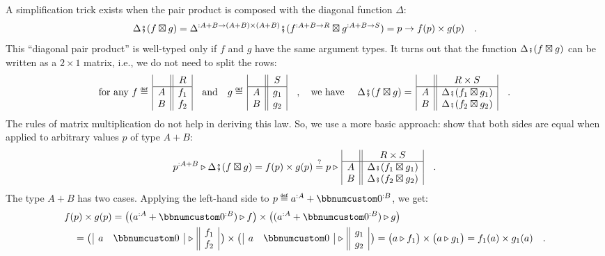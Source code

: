 A simplification trick exists when the pair product is composed with
the diagonal function $\Delta$:
\[
\Delta\bef(f\boxtimes g)=\Delta^{:A+B\rightarrow(A+B)\times(A+B)}\bef(f^{:A+B\rightarrow R}\boxtimes g^{:A+B\rightarrow S})=p\rightarrow f(p)\times g(p)\quad.
\]
This \textsf{``}diagonal pair product\textsf{''} is well-typed only if $f$ and $g$
have the same argument types. It turns out that the function $\Delta\bef(f\boxtimes g)$
can be written as a $2\times1$ matrix, i.e., we do not need to split
the rows:
\[
\text{for any }f\triangleq\,\begin{array}{|c||c|}
 & R\\
\hline A & f_{1}\\
B & f_{2}
\end{array}\quad\text{and}\quad g\triangleq\,\begin{array}{|c||c|}
 & S\\
\hline A & g_{1}\\
B & g_{2}
\end{array}\quad,\quad\text{we have }\quad\Delta\bef(f\boxtimes g)=\,\begin{array}{|c||c|}
 & R\times S\\
\hline A & \Delta\bef(f_{1}\boxtimes g_{1})\\
B & \Delta\bef(f_{2}\boxtimes g_{2})
\end{array}\quad.
\]
The rules of matrix multiplication do not help in deriving this law.
So, we use a more basic approach: show that both sides are equal when
applied to arbitrary values $p$ of type $A+B$:
\[
p^{:A+B}\triangleright\Delta\bef(f\boxtimes g)=f(p)\times g(p)\overset{?}{=}p\triangleright\,\begin{array}{|c||c|}
 & R\times S\\
\hline A & \Delta\bef(f_{1}\boxtimes g_{1})\\
B & \Delta\bef(f_{2}\boxtimes g_{2})
\end{array}\quad.
\]
The type $A+B$ has two cases. Applying the left-hand side to $p\triangleq a^{:A}+\bbnum 0^{:B}$,
we get:
\begin{align*}
 & f(p)\times g(p)=\big((a^{:A}+\bbnum 0^{:B})\triangleright f\big)\times\big((a^{:A}+\bbnum 0^{:B})\triangleright g\big)\\
 & \quad=\big(\,\begin{array}{|cc|}
a & \bbnum 0\end{array}\,\triangleright\,\begin{array}{||c|}
f_{1}\\
f_{2}
\end{array}\,\big)\times\big(\,\begin{array}{|cc|}
a & \bbnum 0\end{array}\,\triangleright\,\begin{array}{||c|}
g_{1}\\
g_{2}
\end{array}\,\big)=\big(a\triangleright f_{1}\big)\times\big(a\triangleright g_{1}\big)=f_{1}(a)\times g_{1}(a)\quad.
\end{align*}
